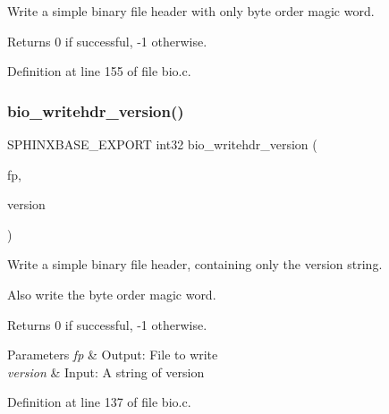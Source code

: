 Write a simple binary file header with only byte order magic word. 

\begin{DoxyReturn}{Returns}
0 if successful, -\/1 otherwise. 
\end{DoxyReturn}


Definition at line 155 of file bio.\+c.

\mbox{\label{bio_8h_a9662c09be1f18377488dedb8e7ca0bfd}} 
\subsubsection{bio\+\_\+writehdr\+\_\+version()}
{\footnotesize\ttfamily S\+P\+H\+I\+N\+X\+B\+A\+S\+E\+\_\+\+E\+X\+P\+O\+RT int32 bio\+\_\+writehdr\+\_\+version (\begin{DoxyParamCaption}\item[{F\+I\+LE $\ast$}]{fp,  }\item[{char $\ast$}]{version }\end{DoxyParamCaption})}



Write a simple binary file header, containing only the version string. 

Also write the byte order magic word. \begin{DoxyReturn}{Returns}
0 if successful, -\/1 otherwise. 
\end{DoxyReturn}

\begin{DoxyParams}{Parameters}
{\em fp} & Output\+: File to write \\
\hline
{\em version} & Input\+: A string of version \\
\hline
\end{DoxyParams}


Definition at line 137 of file bio.\+c.

